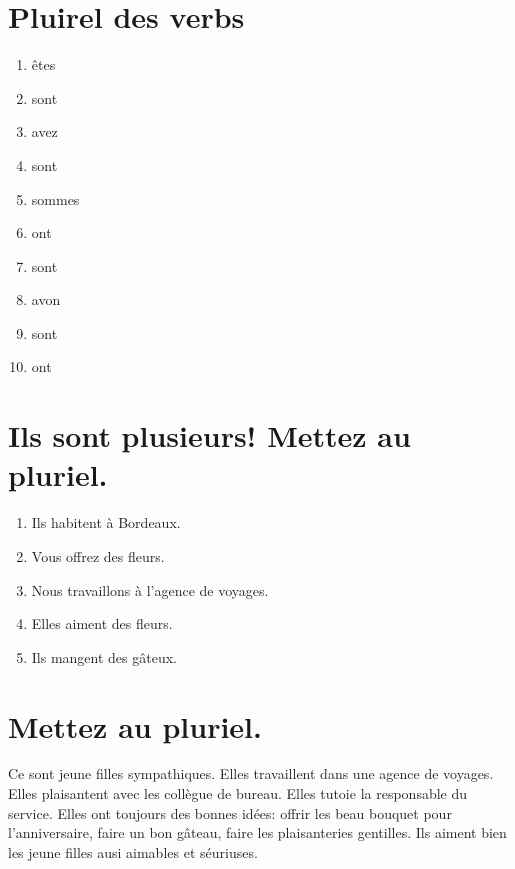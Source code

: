 
\section{Pluirel des verbs}

\begin{enumerate}
    \item êtes
    \item sont
    \item avez
    \item sont
    \item sommes
    \item ont
    \item sont
    \item avon
    \item sont
    \item ont
\end{enumerate}

\section{Ils sont plusieurs! Mettez au pluriel.}

\begin{enumerate}
    \item Ils habitent à Bordeaux.
    \item Vous offrez des fleurs.
    \item Nous travaillons à l'agence de voyages.
    \item Elles aiment des fleurs.
    \item Ils mangent des gâteux.
\end{enumerate}

\section{Mettez au pluriel.}

Ce sont jeune filles sympathiques. Elles travaillent dans une agence de voyages.
Elles plaisantent avec les collègue de bureau. Elles tutoie la responsable du service.
Elles ont toujours des bonnes idées: offrir les beau bouquet pour l'anniversaire, faire
un bon gâteau, faire les plaisanteries gentilles. Ils aiment bien les jeune filles ausi
aimables et séuriuses.


